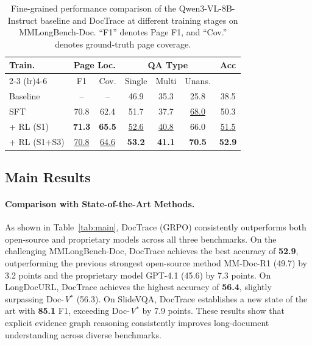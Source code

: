 \documentclass[letterpaper]{article} %
\begin{document}
\begin{table}[t]
\centering
\small
\setlength{\tabcolsep}{1mm}
\begin{tabular}{lcccccc}
\toprule
\multirow{2}{*}{\textbf{Train.}}
& \multicolumn{2}{c}{\textbf{Page Loc.}}
& \multicolumn{3}{c}{\textbf{QA Type}}
& \multirow{2}{*}{\textbf{Acc}} \\
\cmidrule(lr){2-3}
\cmidrule(lr){4-6}
& F1 & Cov. & Single & Multi & Unans. & \\
\midrule

Baseline
& -- & --
& 46.9 & 35.3 & 25.8 & 38.5 \\

\midrule

SFT
& 70.8 & 62.4
& 51.7 & 37.7 & \underline{68.0} & 50.3 \\

+ RL (S1)
& \textbf{71.3} & \textbf{65.5}
& \underline{52.6} & \underline{40.8} & 66.0 & \underline{51.5} \\

+ RL (S1+S3)
& \underline{70.8} & \underline{64.6}
& \textbf{53.2} & \textbf{41.1} & \textbf{70.5} & \textbf{52.9} \\

\bottomrule
\end{tabular}
\caption{
Fine-grained performance comparison of the Qwen3-VL-8B-Instruct baseline and DocTrace at different training stages on MMLongBench-Doc. ``F1'' denotes Page F1, and ``Cov.'' denotes ground-truth page coverage.
}
\label{tab:rl_results}
\end{table}



\subsection{Main Results}

\paragraph{Comparison with State-of-the-Art Methods.}

As shown in Table~\ref{tab:main}, DocTrace (GRPO) consistently outperforms both open-source and proprietary models across all three benchmarks. On the challenging MMLongBench-Doc, DocTrace achieves the best accuracy of \textbf{52.9}, outperforming the previous strongest open-source method MM-Doc-R1 (49.7) by 3.2 points and the proprietary model GPT-4.1 (45.6) by 7.3 points. On LongDocURL, DocTrace achieves the highest accuracy of \textbf{56.4}, slightly surpassing Doc-{\itshape V}$^{*}$ (56.3). On SlideVQA, DocTrace establishes a new state of the art with \textbf{85.1} F1, exceeding Doc-{\itshape V}$^{*}$ by 7.9 points. These results show that explicit evidence graph reasoning consistently improves long-document understanding across diverse benchmarks.
\end{document}
